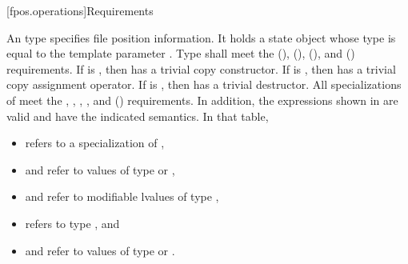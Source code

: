 [fpos.operations]{Requirements}

\pnum
{}%
%
An  type specifies file position information.
It holds a state object
whose type is equal to the template parameter .
Type  shall meet
the  (),
 (),
 (), and
 () requirements.
If  is ,
then  has a trivial copy constructor.
If  is ,
then  has a trivial copy assignment operator.
If  is ,
then  has a trivial destructor.
All specializations of  meet
the ,
,
,
,
and  () requirements.
In addition, the expressions shown in 
are valid and have the indicated semantics.
In that table,
\begin{itemize}
\item {} refers to a specialization of ,
\item {} and  refer to values
of type  or ,
\item {} and  refer to modifiable lvalues of type ,
\item {} refers to type , and
\item {} and  refer to values
of type  or .
\end{itemize}


